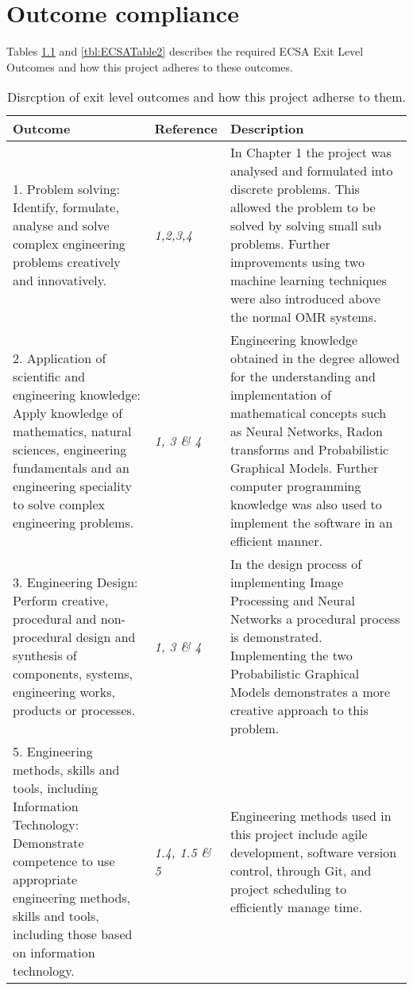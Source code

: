 \chapter{Outcome compliance}
\label{ap:outCompliance}
\graphicspath{{Appendix2/Appendix2figures/}}
Tables \ref{tbl:ECSATable1} and \ref{tbl:ECSATable2} describes the required ECSA Exit Level Outcomes and how this project adheres to these outcomes.
\begin{table}
\caption{Disrcption of exit level outcomes and how this project adherse to them.} \label{tbl:ECSATable1}
\begin{tabular}{|p{6cm}|p{3cm}|p{6cm}|}
\hline
\textbf{Outcome}&\textbf{Reference}&\textbf{Description}\\
\hline
1. Problem solving: Identify, formulate, analyse and solve complex engineering problems creatively and innovatively. & \textit{1,2,3,4} &In Chapter 1 the project was analysed and formulated into discrete problems. This allowed the problem to be solved by solving small sub problems. Further improvements using two machine learning techniques were also introduced above the normal OMR systems.\\
\hline
2. Application of scientific and engineering knowledge: Apply knowledge of mathematics, natural sciences,
engineering fundamentals and an engineering speciality to solve complex engineering problems. & \textit{1, 3 \& 4} & Engineering knowledge obtained in the degree allowed for the understanding and implementation of mathematical concepts such as Neural Networks, Radon transforms and Probabilistic Graphical Models. Further computer programming knowledge was also used to implement the software in an efficient manner.\\
\hline
3. Engineering Design: Perform creative, procedural and non-procedural design and synthesis of components, systems,
engineering works, products or processes. & \textit{1, 3 \& 4} & In the design process of implementing Image Processing and Neural Networks a procedural process is demonstrated. Implementing the two Probabilistic Graphical Models demonstrates a more creative approach to this problem.\\
\hline
5. Engineering methods, skills and tools, including Information Technology: Demonstrate competence to use
appropriate engineering methods, skills and tools, including those based on information technology. &\textit{1.4, 1.5 \& 5}  & Engineering methods used in this project include agile development, software version control, through Git, and project scheduling to efficiently manage time.\\
\hline
\end{tabular}
\end{table}
